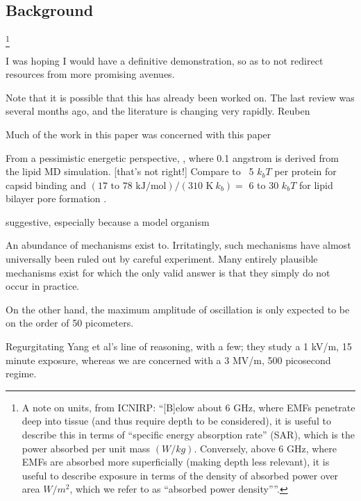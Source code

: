 \documentclass[paper.tex]{subfiles}
\begin{document}
\begin{multicols}{1}

\section{Background}

\footnote{A note on units, from ICNIRP: ``{[B]elow about 6 GHz, where EMFs penetrate deep into tissue (and thus require depth to be considered), it is useful to describe this in terms of “specific energy absorption rate” (SAR), which is the power absorbed per unit mass $(W/kg)$. Conversely, above 6 GHz, where EMFs are absorbed more superficially (making depth less relevant), it is useful to describe exposure in terms of the density of absorbed power over area $W/m^2$, which we refer to as “absorbed power density”}''. }


I was hoping I would have a definitive demonstration, so as to not redirect resources from more promising avenues.


Note that it is possible that this has already been worked on. The last review was several months ago, and the literature is changing very rapidly. Reuben

Much of the work in this paper was concerned with this paper



From a pessimistic energetic perspective, 
, where 0.1 angstrom is derived from the lipid MD simulation. [that's not right!] Compare to ~5 $k_b T$ per protein for capsid binding \cite{Energies2012} \cite{Weak2002} and $ (\text{17 to 78 kJ/mol})  / (310 \text{ K}\ k_b) = $ 6 to 30 $k_b T$ for lipid bilayer pore formation \cite{Atomistic2014a}.




suggestive, especially because a model organism

An abundance of mechanisms exist to. Irritatingly, such mechanisms have almost universally been ruled out by careful experiment. Many entirely plausible mechanisms exist for which the only valid answer is that they simply do not occur in practice.


On the other hand, the maximum amplitude of oscillation is only expected to be on the order of 50 picometers. 


Regurgitating Yang et al's line of reasoning, with a few; they study a 1 kV/m, 15 minute exposure, whereas we are concerned with a 3 MV/m, 500 picosecond regime. 



\end{multicols}
\end{document}
